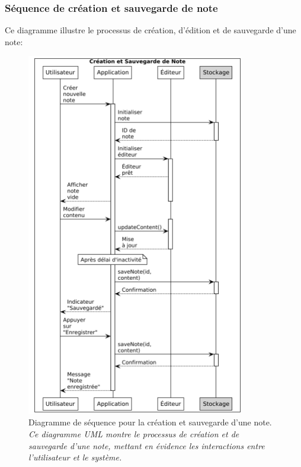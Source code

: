     \subsubsection{Séquence de création et sauvegarde de note}
    
    Ce diagramme illustre le processus de création, d'édition et de sauvegarde d'une note:
    
        \begin{figure}[htbp]
        \centering
        \includegraphics[width=0.85\textwidth]{assets/docs/SayNote_sequence_save.png}
        \caption{Diagramme de séquence pour la création et sauvegarde d'une note. \newline\textit{Ce diagramme UML montre le processus de création et de sauvegarde d'une note, mettant en évidence les interactions entre l'utilisateur et le système.}}
        \label{fig:sequence_save_note}
    \end{figure}
    
